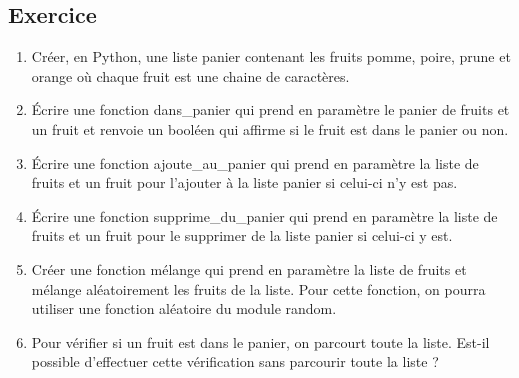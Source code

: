 \documentclass[11pt,a4paper]{article}
\newcounter{numexo}
\begin{document}
\addtocounter{numexo}{1}
\subsection*{\Large Exercice \thenumexo }
\begin{enumerate}
\item Créer, en Python, une liste \textsf{panier} contenant les fruits \textsf{pomme}, \textsf{poire}, \textsf{prune} et \textsf{orange} où chaque fruit est une chaine de caractères.

\item Écrire une fonction \textsf{dans\_panier} qui prend en paramètre le panier de fruits et un fruit et renvoie un booléen qui affirme si le fruit est dans le panier ou non.

\item Écrire une fonction \textsf{ajoute\_au\_panier} qui prend en paramètre la liste de fruits et un fruit pour l'ajouter à la liste \textsf{panier} si celui-ci n'y est pas.

\item Écrire une fonction \textsf{supprime\_du\_panier} qui prend en paramètre la liste de fruits et un fruit pour le supprimer de la liste \textsf{panier} si celui-ci y est.

\item Créer une fonction \textsf{mélange} qui prend en paramètre la liste de fruits et mélange aléatoirement les fruits de la liste. Pour cette fonction, on pourra utiliser une fonction aléatoire du module \textsf{random}.

\item Pour vérifier si un fruit est dans le panier, on parcourt toute la liste. Est-il possible d'effectuer cette vérification sans parcourir toute la liste ?

\end{enumerate}



\addtocounter{numexo}{1}
\end{document}
